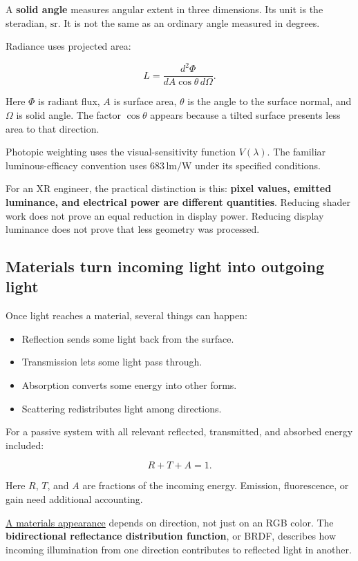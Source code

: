 A \textbf{solid angle} measures angular extent in three dimensions. Its unit is the steradian, \(\mathrm{sr}\). It is not the same as an ordinary angle measured in degrees.

Radiance uses projected area:

\[
L=\frac{d^2\Phi}{dA\cos\theta\,d\Omega}.
\]

Here \(\Phi\) is radiant flux, \(A\) is surface area, \(\theta\) is the angle to the surface normal, and \(\Omega\) is solid angle. The factor \(\cos\theta\) appears because a tilted surface presents less area to that direction.

Photopic weighting uses the visual-sensitivity function \(V(\lambda)\). The familiar luminous-efficacy convention uses \(683\,\mathrm{lm/W}\) under its specified conditions.

For an XR engineer, the practical distinction is this: \textbf{pixel values, emitted luminance, and electrical power are different quantities}. Reducing shader work does not prove an equal reduction in display power. Reducing display luminance does not prove that less geometry was processed.

\subsection{Materials turn incoming light into outgoing light}\label{04-visual-computing-ii-ch043-materials-turn-incoming-light-into-outgoing-light}

Once light reaches a material, several things can happen:

\begin{itemize}
\tightlist
\item
  Reflection sends some light back from the surface.
\item
  Transmission lets some light pass through.
\item
  Absorption converts some energy into other forms.
\item
  Scattering redistributes light among directions.
\end{itemize}

For a passive system with all relevant reflected, transmitted, and absorbed energy included:

\[
R+T+A=1.
\]

Here \(R\), \(T\), and \(A\) are fractions of the incoming energy. Emission, fluorescence, or gain need additional accounting.

\hyperref[appendix-96da0b153b77]{A material\textquotesingle s appearance} depends on direction, not just on an RGB color. The \textbf{bidirectional reflectance distribution function}, or BRDF, describes how incoming illumination from one direction contributes to reflected light in another.

